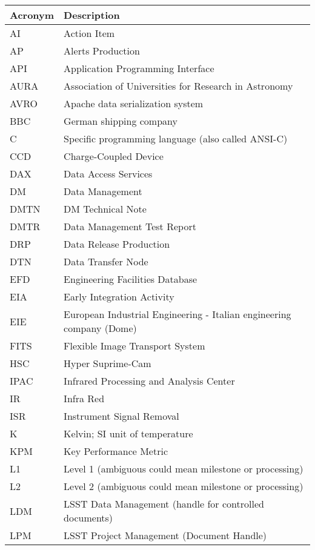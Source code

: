 \addtocounter{table}{-1}
\begin{longtable}{|l|p{}|}\hline
\textbf{Acronym} & \textbf{Description}  \\\hline

AI & Action Item \\\hline
AP & Alerts Production \\\hline
API & Application Programming Interface \\\hline
AURA & Association of Universities for Research in Astronomy \\\hline
AVRO & Apache data serialization system \\\hline
BBC & German shipping company \\\hline
C & Specific programming language (also called ANSI-C) \\\hline
CCD & Charge-Coupled Device \\\hline
DAX & Data Access Services \\\hline
DM & Data Management \\\hline
DMTN & DM Technical Note \\\hline
DMTR & Data Management Test Report \\\hline
DRP & Data Release Production \\\hline
DTN & Data Transfer Node \\\hline
EFD & Engineering Facilities Database \\\hline
EIA & Early Integration Activity \\\hline
EIE & European Industrial Engineering  - Italian engineering company (Dome) \\\hline
FITS & Flexible Image Transport System \\\hline
HSC & Hyper Suprime-Cam \\\hline
IPAC & Infrared Processing and Analysis Center \\\hline
IR & Infra Red \\\hline
ISR & Instrument Signal Removal \\\hline
K & Kelvin; SI unit of temperature \\\hline
KPM & Key Performance Metric \\\hline
L1 & Level 1 (ambiguous could mean milestone or processing) \\\hline
L2 & Level 2 (ambiguous could mean milestone or processing) \\\hline
LDM & LSST Data Management (handle for controlled documents) \\\hline
LPM & LSST Project Management (Document Handle) \\\hline

\end{longtable}
